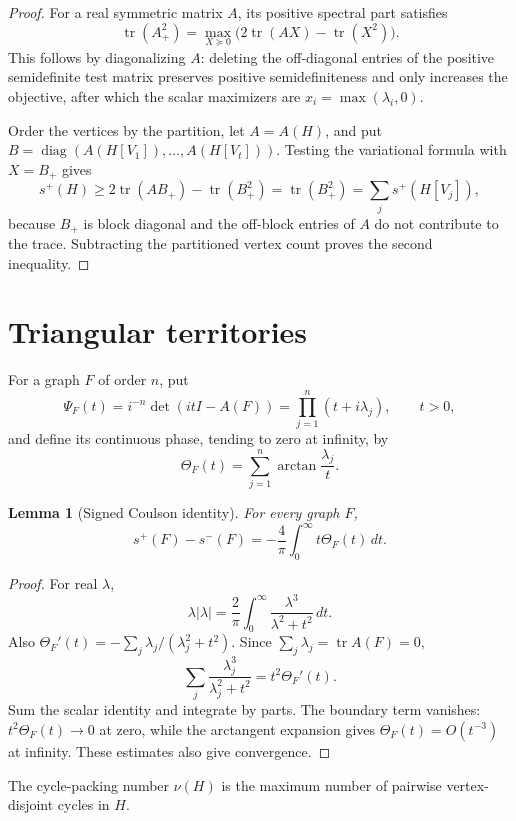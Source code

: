 \documentclass[11pt]{article}
\newtheorem{lemma}[theorem]{Lemma}
\theoremstyle{remark}
\newcommand{\splus}{s^+}
\newcommand{\sminus}{s^-}
\begin{document}
\begin{proof}
For a real symmetric matrix $A$, its positive spectral part satisfies
\[
 \operatorname{tr}(A_+^2)
 =\max_{X\succeq0}\bigl(2\operatorname{tr}(AX)-\operatorname{tr}(X^2)\bigr).
\]
This follows by diagonalizing $A$: deleting the off-diagonal entries of the
positive semidefinite test matrix preserves positive semidefiniteness and only
increases the objective, after which the scalar maximizers are
$x_i=\max(\lambda_i,0)$.

Order the vertices by the partition, let $A=A(H)$, and put
$B=\operatorname{diag}(A(H[V_1]),\ldots,A(H[V_t]))$.  Testing the variational
formula with $X=B_+$ gives
\[
 \splus(H)\geq2\operatorname{tr}(AB_+)-\operatorname{tr}(B_+^2)
 =\operatorname{tr}(B_+^2)=\sum_j\splus(H[V_j]),
\]
because $B_+$ is block diagonal and the off-block entries of $A$ do not
contribute to the trace.  Subtracting the partitioned vertex count proves the
second inequality.
\end{proof}

\section{Triangular territories}

For a graph $F$ of order $n$, put
\[
 \Psi_F(t)=i^{-n}\det(itI-A(F))
 =\prod_{j=1}^n(t+i\lambda_j),\qquad t>0,
\]
and define its continuous phase, tending to zero at infinity, by
\[
 \Theta_F(t)=\sum_{j=1}^n\arctan\frac{\lambda_j}{t}.
\]

\begin{lemma}[Signed Coulson identity]\label{lem:coulson}
For every graph $F$,
\[
 \splus(F)-\sminus(F)
 =-\frac4\pi\int_0^\infty t\Theta_F(t)\,dt.
\]
\end{lemma}

\begin{proof}
For real $\lambda$,
\[
 \lambda|\lambda|=\frac2\pi\int_0^\infty
       \frac{\lambda^3}{\lambda^2+t^2}\,dt.
\]
Also $\Theta_F'(t)=-\sum_j\lambda_j/(\lambda_j^2+t^2)$.  Since
$\sum_j\lambda_j=\operatorname{tr}A(F)=0$,
\[
 \sum_j\frac{\lambda_j^3}{\lambda_j^2+t^2}=t^2\Theta_F'(t).
\]
Sum the scalar identity and integrate by parts.  The boundary term vanishes:
$t^2\Theta_F(t)\to0$ at zero, while the arctangent expansion gives
$\Theta_F(t)=O(t^{-3})$ at infinity.  These estimates also give convergence.
\end{proof}

The cycle-packing number $\nu(H)$ is the maximum number of pairwise
vertex-disjoint cycles in $H$.
\end{document}
